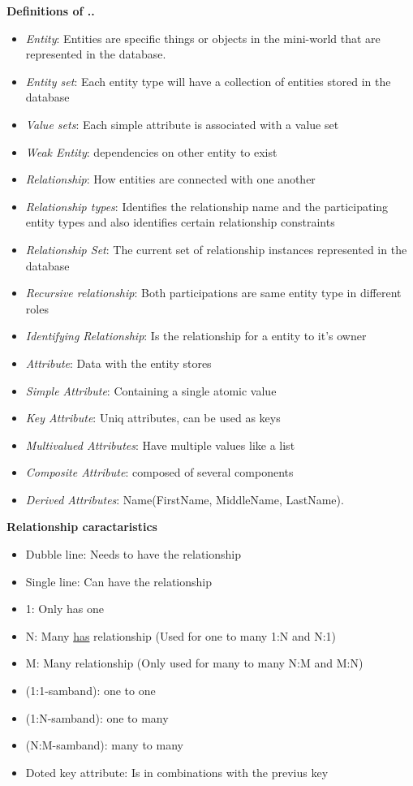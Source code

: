 \newpage
\noindent\textbf{Definitions of ..}
\begin{itemize}
    \item \textit{Entity}: Entities are specific things or objects in the 
    mini-world that are represented in the database.
    \item \textit{Entity set}: Each entity type will have a collection of entities stored in the database
    \item \textit{Value sets}: Each simple attribute is associated with a value set
    \item \textit{Weak Entity}: dependencies on other entity to exist
    \item \textit{Relationship}: How entities are connected with one another
    \item \textit{Relationship types}: Identifies the relationship name and the participating entity types and also identifies certain relationship constraints
    \item \textit{Relationship Set}: The current set of relationship instances represented in the database
    \item \textit{Recursive relationship}: Both participations are same entity type in different roles
    \item \textit{Identifying Relationship}: Is the relationship for a entity to it's owner
    \item \textit{Attribute}: Data with the entity stores
    \item \textit{Simple Attribute}: Containing a single atomic value
    \item \textit{Key Attribute}: Uniq attributes, can be used as keys
    \item \textit{Multivalued Attributes}: Have multiple values like a list
    \item \textit{Composite Attribute}: composed of several components
    \item \textit{Derived Attributes}: Name(FirstName, MiddleName, LastName).
\end{itemize}


\newpage
\noindent\textbf{Relationship caractaristics}
\begin{itemize}
    \item Dubble line: Needs to have the relationship
    \item Single line: Can have the relationship
    \item 1: Only has one
    \item N: Many \underline{has} relationship (Used for one to many 1:N and N:1)
    \item M: Many relationship (Only used for many to many N:M and M:N)
    \item (1:1-samband): one to one
    \item (1:N-samband): one to many
    \item (N:M-samband): many to many 
    \item Doted key attribute: Is in combinations with the previus key
\end{itemize}

